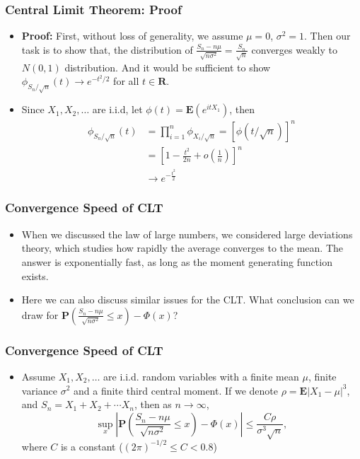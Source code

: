 \documentclass[handout]{beamer}
\newcommand{\BP}{\mathbf{P}}
\newcommand{\BE}{\mathbf{E}}
\begin{document}
 
     \frame
{
  \frametitle{Central Limit Theorem: Proof}

 \begin{itemize}
\item<1-> \textbf{Proof:} First, without loss of generality, we assume $\mu=0$, $\sigma^2=1$. Then our task is to show that, the distribution of $\frac{S_n-n\mu}{\sqrt{n\sigma^2}}=\frac{S_n}{\sqrt{n}}$ converges weakly to $N(0,1)$ distribution. And it would be sufficient to show $\phi_{S_n/\sqrt{n}}(t)\rightarrow e^{-t^2/2}$ for all $t\in \mathbf{R}$. 
\item<2->[-] Since $X_1, X_2, \ldots$ are i.i.d, let $\phi(t)=\BE(e^{itX_1})$, then
\begin{align*}
\phi_{S_n/\sqrt{n}}(t)&=\prod_{i=1}^n \phi_{X_i/\sqrt{n}}=[\phi(t/\sqrt{n})]^n \\
&=[1-\frac{t^2}{2n}+o(\frac{1}{n})]^n \\
&\rightarrow e^{-\frac{t^2}{2}}
\end{align*}

\end{itemize}
 }
 
 
 
\frame
{
  \frametitle{Convergence Speed of CLT}

 \begin{itemize}
 \item<1-> When we discussed the law of large numbers, we considered large deviations theory, which studies how rapidly the average converges to the mean. The answer is exponentially fast, as long as the moment generating function exists. 
 
 \item<2-> Here we can also discuss similar issues for the CLT. What conclusion can we draw for  $\BP(\frac{S_n-n\mu}{\sqrt{n\sigma^2}} \leq x)-\Phi(x)$? 
 
\end{itemize}
 }


\frame
{
  \frametitle{Convergence Speed of CLT}

 \begin{itemize} 
 
 \item<2-> []\begin{Theorem} Assume $X_1, X_2, \ldots $ are i.i.d. random variables with a finite mean $\mu$, finite variance $\sigma^2$ and a finite third central moment. If we denote $\rho=\BE|X_1-\mu|^3$, and  $S_n=X_1+X_2+\cdots X_n$, then as $n\rightarrow \infty$, 
 $$\sup_x| \BP(\frac{S_n-n\mu}{\sqrt{n\sigma^2}} \leq x)-\Phi(x)| \leq \frac{C\rho}{\sigma^3\sqrt{n}},$$
 where $C$ is a constant ($(2\pi)^{-1/2}\leq C <0.8$)
 \end{Theorem}

\end{itemize}
 }
\end{document}
